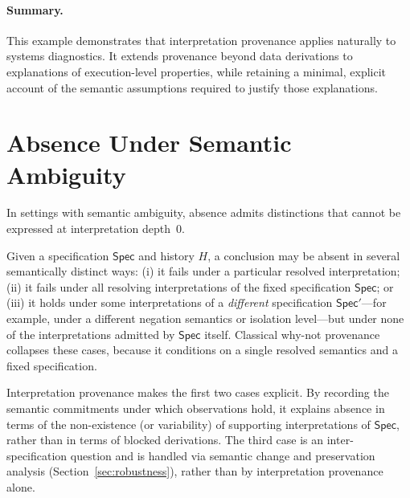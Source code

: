 \documentclass[acmsmall,nonacm]{acmart}
\theoremstyle{remark}
\numberwithin{definition}{section}
\numberwithin{theorem}{section}
\numberwithin{lemma}{section}
\numberwithin{corollary}{section}
\numberwithin{remark}{section}
\numberwithin{example}{section}
\numberwithin{observation}{section}
\numberwithin{assumption}{section}
\newcommand{\Spec}{\mathsf{Spec}}
\begin{document}
\paragraph{Summary.}
This example demonstrates that interpretation provenance applies naturally to
systems diagnostics.
It extends provenance beyond data derivations to explanations of execution-level
properties, while retaining a minimal, explicit account of the semantic
assumptions required to justify those explanations.

\section{Absence Under Semantic Ambiguity}
\label{app:whynot}
In settings with semantic ambiguity, absence admits distinctions that cannot be
expressed at interpretation depth~0.

Given a specification $\Spec$ and history $H$, a conclusion may be absent in
several semantically distinct ways:
(i) it fails under a particular resolved interpretation;
(ii) it fails under all resolving interpretations of the fixed specification
$\Spec$; or
(iii) it holds under some interpretations of a \emph{different} specification
$\Spec'$—for example, under a different negation semantics or isolation level—but
under none of the interpretations admitted by $\Spec$ itself.
Classical why-not provenance collapses these cases, because it conditions on a
single resolved semantics and a fixed specification.

Interpretation provenance makes the first two cases explicit.
By recording the semantic commitments under which observations hold, it explains
absence in terms of the non-existence (or variability) of supporting
interpretations of $\Spec$, rather than in terms of blocked derivations.
The third case is an inter-specification question and is handled via semantic
change and preservation analysis (Section~\ref{sec:robustness}), rather than by
interpretation provenance alone.


\end{document}
